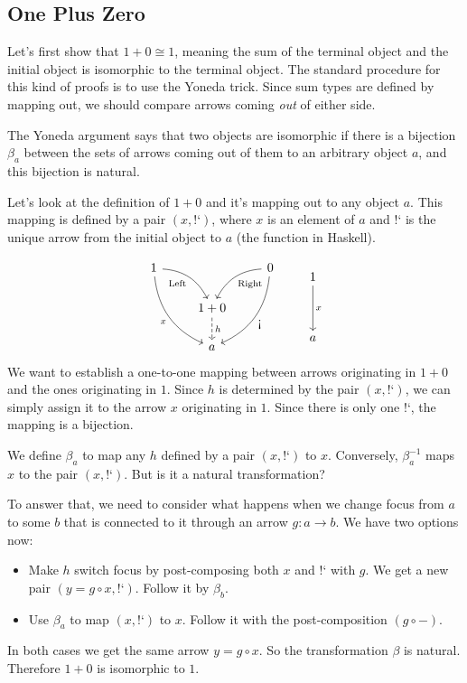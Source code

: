 \documentclass[DaoFP]{subfiles}
\begin{document}
\subsection{One Plus Zero}
Let's first show that $1 + 0 \cong 1$, meaning the sum of the terminal object and the initial object is isomorphic to the terminal object. The standard procedure for this kind of proofs is to use the Yoneda trick. Since sum types are defined by mapping out, we should compare arrows coming \emph{out} of either side. 

The Yoneda argument says that two objects are isomorphic if there is a bijection $\beta_a$ between the sets of arrows coming out of them to an arbitrary object $a$, and this bijection is natural.  
 
Let's look at the definition of $1 + 0$ and it's mapping out to any object $a$. This mapping is defined by a pair $(x, \mbox{!`})$, where $x$ is an element of $a$ and $\mbox{!`}$ is the unique arrow from the initial object to $a$ (the  function in Haskell). 

\[
 \begin{tikzcd}
 1
 \arrow[dr,  bend left, "\text{Left}"']
 \arrow[ddr, bend right, "x"']
 && 0
 \arrow[dl, bend right, "\text{Right}"]
 \arrow[ddl, bend left, "\mbox{!`}"]
 \\
&1 + 0
\arrow[d, dashed, "h"]
\\
& a
 \end{tikzcd}
 \qquad
 \begin{tikzcd}
 1
 \arrow[dd, "x"]
 \\
 \\
 a
 \end{tikzcd}
\]
We want to establish a one-to-one mapping between arrows originating in $1+0$ and the ones originating in $1$. Since $h$ is determined by the pair $(x, \mbox{!`})$, we can simply assign it to the arrow $x$ originating in $1$. Since there is only one $\mbox{!`}$, the mapping is a bijection. 

We define $\beta_a$ to map any $h$ defined by a pair $(x, \mbox{!`})$ to $x$. Conversely, $\beta^{-1}_a$ maps $x$ to the pair $(x, \mbox{!`})$. But is it a natural transformation? 

To answer that, we need to consider what happens when we change focus from $a$ to some $b$ that is connected to it through an arrow $g \colon a \to b$. We have two options now:
\begin{itemize}
\item Make $h$ switch focus by post-composing both $x$ and $\mbox{!`}$ with $g$. We get a new pair $(y = g \circ x, \mbox{!`})$. Follow it by $\beta_b$.
\item Use $\beta_a$ to map $(x, \mbox{!`})$ to $x$. Follow it with the post-composition $(g \circ -)$. 
\end{itemize}
In both cases we get the same arrow $y = g \circ x$. So the transformation $\beta$ is natural. Therefore $1 + 0$ is isomorphic to $1$.
\end{document}
